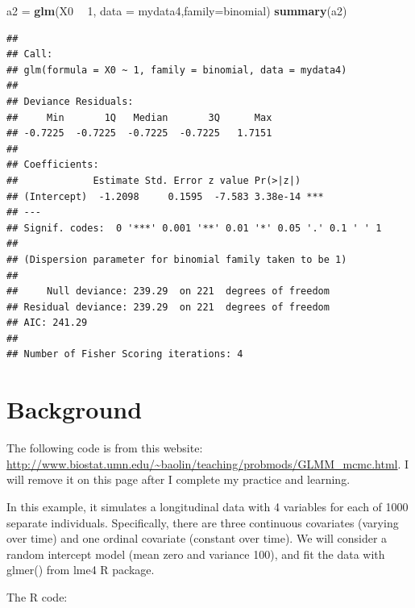\documentclass[]{book}
\newenvironment{Shaded}{\begin{snugshade}}{\end{snugshade}}
\newcommand{\KeywordTok}[1]{\textcolor[rgb]{0.13,0.29,0.53}{\textbf{#1}}}
\newcommand{\DataTypeTok}[1]{\textcolor[rgb]{0.13,0.29,0.53}{#1}}
\newcommand{\DecValTok}[1]{\textcolor[rgb]{0.00,0.00,0.81}{#1}}
\newcommand{\StringTok}[1]{\textcolor[rgb]{0.31,0.60,0.02}{#1}}
\newcommand{\OperatorTok}[1]{\textcolor[rgb]{0.81,0.36,0.00}{\textbf{#1}}}
\newcommand{\NormalTok}[1]{#1}
\begin{document}
\begin{Shaded}
\begin{Highlighting}[]
\NormalTok{a2 =}\StringTok{ }\KeywordTok{glm}\NormalTok{(X0 }\OperatorTok{~}\StringTok{ }\DecValTok{1}\NormalTok{, }\DataTypeTok{data =}\NormalTok{ mydata4,}\DataTypeTok{family=}\NormalTok{binomial)}
\KeywordTok{summary}\NormalTok{(a2)}
\end{Highlighting}
\end{Shaded}

\begin{verbatim}
## 
## Call:
## glm(formula = X0 ~ 1, family = binomial, data = mydata4)
## 
## Deviance Residuals: 
##     Min       1Q   Median       3Q      Max  
## -0.7225  -0.7225  -0.7225  -0.7225   1.7151  
## 
## Coefficients:
##             Estimate Std. Error z value Pr(>|z|)    
## (Intercept)  -1.2098     0.1595  -7.583 3.38e-14 ***
## ---
## Signif. codes:  0 '***' 0.001 '**' 0.01 '*' 0.05 '.' 0.1 ' ' 1
## 
## (Dispersion parameter for binomial family taken to be 1)
## 
##     Null deviance: 239.29  on 221  degrees of freedom
## Residual deviance: 239.29  on 221  degrees of freedom
## AIC: 241.29
## 
## Number of Fisher Scoring iterations: 4
\end{verbatim}

\section{Background}\label{background}

The following code is from this website:
\url{http://www.biostat.umn.edu/~baolin/teaching/probmods/GLMM_mcmc.html}.
I will remove it on this page after I complete my practice and learning.

In this example, it simulates a longitudinal data with 4 variables for
each of 1000 separate individuals. Specifically, there are three
continuous covariates (varying over time) and one ordinal covariate
(constant over time). We will consider a random intercept model (mean
zero and variance 100), and fit the data with glmer() from lme4 R
package.

The R code:
\end{document}
